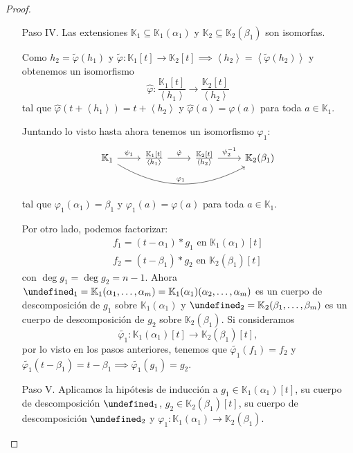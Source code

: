 \documentclass[10pt, spanish]{report}
\theoremstyle{definition}
\newcommand{\K}{\mathbb{K}}
\let\L\undefined
\newcommand{\L}{\mathbb{L}}
\begin{document}
\begin{proof}
\begin{itemize}[itemindent=30pt]
\begin{enumerate}[itemindent=24pt]
                \item[Paso IV.] Las extensiones $\K_1\subseteq\K_1(\alpha_1)$ y
                    $\K_2\subseteq\K_2(\beta_1)$ son isomorfas.

                    Como $h_2=\tilde{\varphi}(h_1)$ y
                    $\tilde{\varphi}:\K_1[t]\to \K_2[t]\implies\left<h_2\right>
                    = \left< \tilde{\varphi}(h_2) \right> $ y obtenemos un
                    isomorfismo \[\hat{\varphi}:\frac{\K_1[t]}{\left<h_1\right>}
                    \to \frac{\K_2[t]}{\left<h_2\right>}\] tal que
                    $\hat{\varphi}(t+\left< h_1 \right> )=t+\left< h_2 \right>$
                    y $\hat{\varphi}(a)=\varphi(a)$ para toda $a\in\K_1$.

                    Juntando lo visto hasta ahora tenemos un isomorfismo
                    $\varphi_1$:
                    \[\begin{tikzcd}
                        \K_1\ar{r}{\psi_1}\ar[bend right]{rrr}{\varphi_1}&
                    \frac{\K_1[t]}{\left<h_1\right>}\ar{r}{\hat{\varphi}}&
                    \frac{\K_2[t]}{\left<h_2\right>}\ar{r} {\psi_2^{-1}}&
                        \K_2(\beta_1)
                    \end{tikzcd}\]
                    tal que $\varphi_1(\alpha_1)=\beta_1$ y
                    $\varphi_1(a)=\varphi(a)$ para toda $a\in\K_1$.

                    Por otro lado, podemos factorizar:
                    \begin{align*}
                        f_1=(t-\alpha_1)*g_1\text{ en }\K_1(\alpha_1)[t]\\
                        f_2=(t-\beta_1)*g_2\text{ en }\K_2(\beta_1)[t]
                    \end{align*}
                    con $\deg{g_1}=\deg{g_2}=n-1$. Ahora
                    $\L_1=\K_1(\alpha_1,\ldots,\alpha_m)=\K_1(\alpha_1)(\alpha_2,
                    \ldots,\alpha_m)$ es un cuerpo de descomposición de $g_1$
                    sobre $\K_1(\alpha_1)$ y $\L_2=\K_2(\beta_1,\ldots,\beta_m)$
                    es un cuerpo de descomposición de $g_2$ sobre
                    $\K_2(\beta_1)$. Si consideramos \[\tilde{\varphi_1}:
                    \K_1(\alpha_1)[t]\to\K_2(\beta_1)[t],\] por lo visto en los
                    pasos anteriores, tenemos que $\tilde{\varphi_1}(f_1)=f_2$ y
                    $\tilde{\varphi_1}(t-\beta_1)=t-\beta_1 \implies
                    \tilde{\varphi_1}(g_1)=g_2$.
                \item[Paso V.] Aplicamos la hipótesis de inducción a
                    $g_1\in\K_1(\alpha_1)[t]$, su cuerpo de descomposición
                    $\L_1$, $g_2\in\K_2(\beta_1)[t]$, su cuerpo de
                    descomposición $\L_2$ y $\varphi_1:\K_1(\alpha_1)\to
                    \K_2(\beta_1)$.


\end{enumerate}
\end{itemize}
\end{proof}
\end{document}
